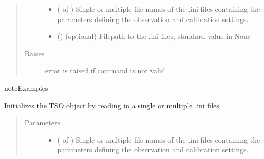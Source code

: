 \documentclass[a4paper,10pt,english]{sphinxmanual}
\begin{document}
\begin{fulllineitems}
\begin{fulllineitems}
\begin{quote}
\begin{description}
\begin{itemize}
\item {} 
 ( of ) \textendash{} Single or multiple file names of the .ini files containing the
parameters defining the observation and calibration settings.

\item {} 
 () \textendash{} (optional) Filepath to the .ini files, standard value in None

\end{itemize}

\item[{Raises}] \leavevmode
{} \textendash{} error is raised if command is not valid

\end{description}\end{quote}

\begin{sphinxadmonition}{note}{Examples}

%
\begin{sphinxVerbatim}[commandchars=\\\{\}]
\end{sphinxVerbatim}
\end{sphinxadmonition}

\end{fulllineitems}


\begin{fulllineitems}
\label{\detokenize{cascade.TSO:cascade.TSO.TSO.TSOSuite.initialize_TSO}}
Initializes the TSO object by reading in a single or
multiple .ini files
\begin{quote}\begin{description}
\item[{Parameters}] \leavevmode\begin{itemize}
\item {} 
 ( of ) \textendash{} Single or multiple file names of the .ini files containing the
parameters defining the observation and calibration settings.


\end{itemize}
\end{description}
\end{quote}
\end{fulllineitems}
\end{fulllineitems}
\end{document}
